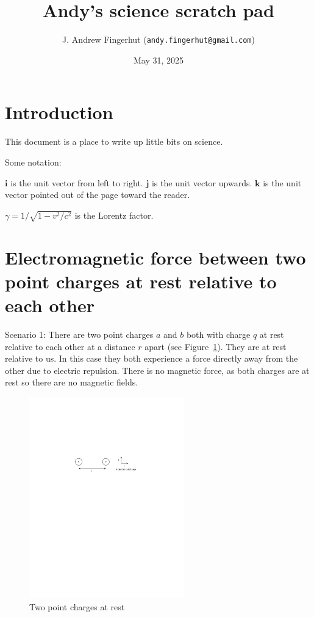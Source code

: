 \documentclass[a4paper]{article}
\title{Andy's science scratch pad}
\author{J. Andrew Fingerhut (\texttt{andy.fingerhut@gmail.com})}
\date{
        May 31, 2025
}
\theoremstyle{plain}
\theoremstyle{definition}
\newcommand{\ihat}{\textbf{i}}
\newcommand{\jhat}{\textbf{j}}
\newcommand{\khat}{\textbf{k}}
\begin{document}
\maketitle


\tableofcontents

\section{Introduction}
\label{sec:intro}

This document is a place to write up little bits on science.

Some notation:

$\ihat$ is the unit vector from left to right.
$\jhat$ is the unit vector upwards.
$\khat$ is the unit vector pointed out of the page toward the reader.

$\gamma = 1/\sqrt{1-v^2/c^2}$ is the Lorentz factor.


\section{Electromagnetic force between two point charges at rest relative to each other}
\label{sec:twocharges}

Scenario 1: There are two point charges $a$ and $b$ both with charge
$q$ at rest relative to each other at a distance $r$ apart (see
Figure~\ref{fig:two-charges-at-rest}).  They are at rest relative
to us.  In this case they both experience a force directly away from
the other due to electric repulsion.  There is no magnetic force, as
both charges are at rest so there are no magnetic fields.

\begin{figure}[ht]
	\centering
	\includegraphics[width=0.6\textwidth]{two-charges-at-rest-cropped.pdf}
	\caption{Two point charges at rest}
	\label{fig:two-charges-at-rest}
\end{figure}
\end{document}
